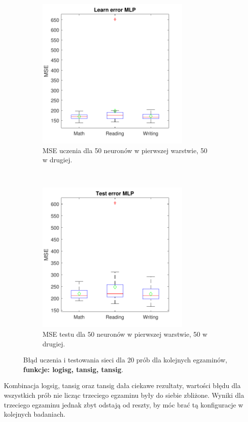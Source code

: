 \documentclass[12pt]{article}
\begin{document}
\begin{figure}[H]
\begin{subfigure}[t]{0.48\textwidth} 
\centering
\includegraphics[height=3in]{logsig_tansig_tansig_50_learnBoxplot.pdf}
\caption{MSE uczenia dla  50 neuronów w pierwszej warstwie, 50 w drugiej.}
\end{subfigure}
~~
\begin{subfigure}[t]{0.48\textwidth} 
\centering
\includegraphics[height=3in]{logsig_tansig_tansig_50_testBoxplot.pdf}
\caption{MSE testu dla 50 neuronów w pierwszej warstwie, 50 w drugiej.}
\end{subfigure}

\caption{Błąd uczenia i testowania sieci dla 20 prób dla kolejnych egzaminów, \textbf{funkcje: logisg, tansig, tansig}.}
\end{figure}

Kombinacja logsig, tansig oraz tansig dała ciekawe rezultaty, wartości błędu dla wszystkich prób nie licząc trzeciego egzaminu były do siebie zbliżone. Wyniki dla trzeciego egzaminu jednak zbyt odstają od reszty, by móc brać tą konfiguracje w kolejnych badaniach.
\end{document}
